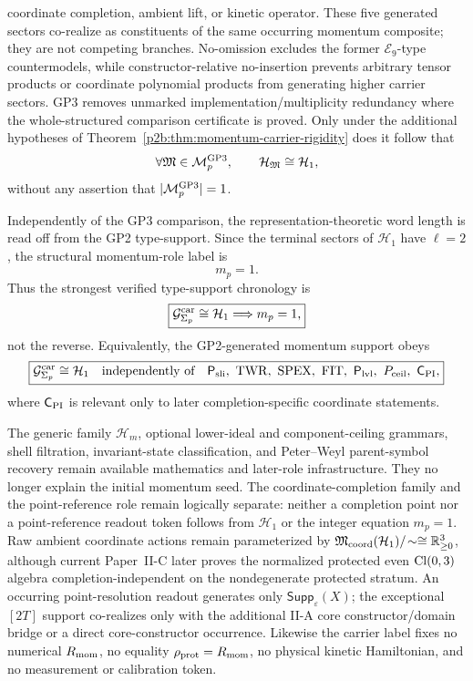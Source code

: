 \documentclass[12pt,a4paper]{article}
\begin{document}
coordinate completion, ambient lift, or kinetic operator.
These five generated sectors co-realize as constituents of the same occurring
momentum composite; they are not competing branches.  No-omission excludes the
former \(\mathcal E_9\)-type countermodels, while constructor-relative
no-insertion prevents arbitrary tensor products or coordinate polynomial
products from generating higher carrier sectors.  GP3 removes unmarked implementation/multiplicity redundancy where the
whole-structured comparison certificate is proved.  Only under the additional
hypotheses of Theorem~\ref{p2b:thm:momentum-carrier-rigidity} does it follow
that
\[
 \forall\mathfrak M\in\mathcal M_p^{\rm GP3},\qquad
 \mathcal H_{\mathfrak M}\cong\mathcal H_1,
\]
without any assertion that \(|\mathcal M_p^{\rm GP3}|=1\).

Independently of the GP3 comparison, the representation-theoretic word
length is read off from the GP2 type-support.  Since the terminal sectors of \(\mathcal H_1\) have
\(\ell=2\), the structural momentum-role label is
\[
 \boxed{m_p=1}.
\]
Thus the strongest verified type-support chronology is
\[
 \boxed{\mathcal G^{\rm car}_{\Sigma_p}\cong\mathcal H_1\Longrightarrow m_p=1,}
\]
not the reverse.  Equivalently, the GP2-generated momentum support obeys
\[
 \boxed{
 \mathcal G^{\rm car}_{\Sigma_p}\cong\mathcal H_1
 \quad\text{independently of}\quad
 \mathsf P_{\rm sli},\ \mathrm{TWR},\ \mathrm{SPEX},\ \mathrm{FIT},\
 \mathsf P_{\rm lvl},\ P_{\rm ceil},\ \mathsf C_{\rm PI},}
\]
where \(\mathsf C_{\rm PI}\) is relevant only to later completion-specific
coordinate statements.

The generic family \(\mathcal H_m\), optional lower-ideal and component-ceiling
grammars, shell filtration, invariant-state classification, and Peter--Weyl
parent-symbol recovery remain available mathematics and later-role
infrastructure.  They no longer explain the initial momentum seed.
The coordinate-completion family and the point-reference role remain
logically separate: neither a completion point nor a point-reference readout
token follows from \(\mathcal H_1\) or the integer equation \(m_p=1\).  Raw
ambient coordinate actions remain parameterized by
\(\mathfrak M_{\rm coord}(\mathcal H_1)/\!\sim\cong\mathbb R_{\ge0}^3\),
although current Paper~II-C later proves the normalized protected even
\(\operatorname{Cl}(0,3)\) algebra completion-independent on the nondegenerate protected
stratum.  An occurring point-resolution readout generates only
\(\mathsf{Supp}_{\varepsilon}(X)\); the exceptional \([2T]\) support
co-realizes only with the additional II-A core constructor/domain bridge or a
direct core-constructor occurrence.  Likewise the carrier label fixes no
numerical \(R_{\mathrm{mom}}\), no equality \(\rho_{\rm prot}=R_{\mathrm{mom}}\), no physical
kinetic Hamiltonian, and no measurement or calibration token.
\end{document}
